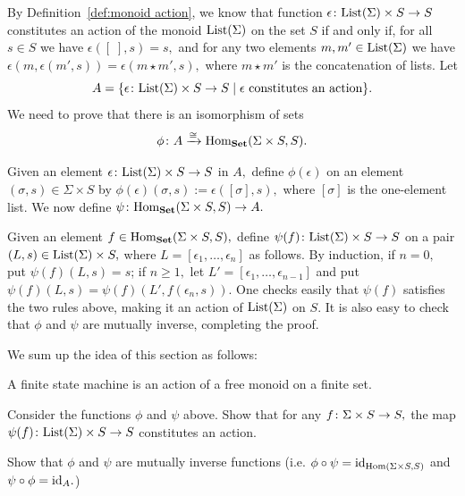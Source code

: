 \documentclass[CT4S-EN-RU]{subfiles}
\begin{document}
\begin{proofENG}
By Definition~\ref{def:monoid action}, we know that function $\epsilon\colon\textnormal{List}(\Sigma)\times S\rightarrow S$ constitutes an action of the monoid $\textnormal{List}(\Sigma)$ on the set $S$ if and only if, for all $s\in S$ we have $\epsilon([\;],s)=s,$ and for any two elements $m,m'\in\textnormal{List}(\Sigma)$ we have $\epsilon(m,\epsilon(m',s))=\epsilon(m\star m',s),$ where $m\star m'$ is the concatenation of lists. Let $$A=\{\epsilon\colon \textnormal{List}(\Sigma)\times S\rightarrow S{\;|\;}\epsilon\textnormal{ constitutes an action}\}.$$ We need to prove that there is an isomorphism of sets $$\phi\colon A\xrightarrow{\cong}\textnormal{Hom}_{\mathbf{Set}}(\Sigma\times S,S).$$

Given an element $\epsilon\colon\textnormal{List}(\Sigma)\times S\rightarrow S$ in $A,$ define $\phi(\epsilon)$ on an element $(\sigma,s)\in\Sigma\times S$ by $\phi(\epsilon)(\sigma,s):=\epsilon([\sigma],s),$ where $[\sigma]$ is the one-element list. We now define $\psi\colon\textnormal{Hom}_{\mathbf{Set}}(\Sigma\times S,S)\rightarrow A.$

Given an element $f\in\textnormal{Hom}_{\mathbf{Set}}(\Sigma\times S,S),$ define $\psi(f)\colon\textnormal{List}(\Sigma)\times S\rightarrow S$ on a pair $(L,s)\in\textnormal{List}(\Sigma)\times S,$ where $L=[\epsilon_1,\ldots,\epsilon_n]$ as follows. By induction, if $n=0,$ put $\psi(f)(L,s)=s$; if $n\geq 1,$ let $L'=[\epsilon_1,\ldots,\epsilon_{n-1}]$ and put $\psi(f)(L,s)=\psi(f)(L',f(\epsilon_n,s)).$ One checks easily that $\psi(f)$ satisfies the two rules above, making it an action of $\textnormal{List}(\Sigma)$ on $S.$ It is also easy to check that $\phi$ and $\psi$ are mutually inverse, completing the proof.
\end{proofENG}

\begin{proofRUS}
\end{proofRUS}

\begin{blockENG}
We sum up the idea of this section as follows:
\begin{slogan}
A finite state machine is an action of a free monoid on a finite set.
\end{slogan}
\end{blockENG}

\begin{blockRUS}
\end{blockRUS}

\begin{exerciseENG}
Consider the functions $\phi$ and $\psi$ above.
\sexc Show that for any $f\colon\Sigma\times S\rightarrow S,$ the map $\psi(f)\colon\textnormal{List}(\Sigma)\times S\rightarrow S$ constitutes an action.
\item Show that $\phi$ and $\psi$ are mutually inverse functions (i.e. $\phi\circ\psi=\textnormal{id}_{\textnormal{Hom}(\Sigma\times S,S)}$ and $\psi\circ\phi=\textnormal{id}_{A}.$)
\endsexc
\end{exerciseENG}
\end{document}
